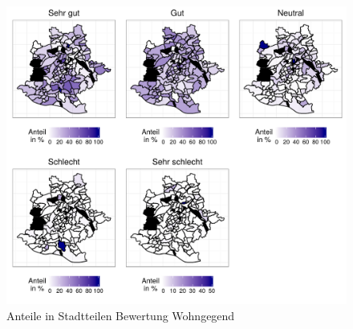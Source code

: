 \documentclass{Vorlage}
\begin{document}
\begin{appendix}
\begin{figure}[h]
 \begin{center}
 \includegraphics[scale=0.8]{Pictures/SWohn}
 \caption{Anteile in Stadtteilen Bewertung Wohngegend}
 \label{SWohn}
 \end{center}
\end{figure}


\end{appendix}
\clearpage
\pagestyle{plain}

\end{document}
